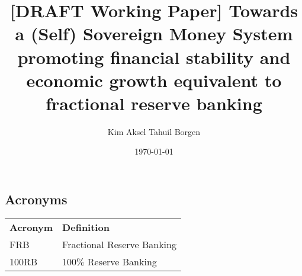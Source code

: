 \documentclass{article}
\title{[DRAFT Working Paper] Towards a (Self) Sovereign Money System promoting financial stability and economic growth equivalent to fractional reserve banking}
\author{Kim Aksel Tahuil Borgen}
\date{\today}
\begin{document}
\maketitle

\begin{abstract}
        
\end{abstract}
\subsection{Acronyms}

\begin{tabular}{ll}
\textbf{Acronym} & \textbf{Definition} \\
FRB & Fractional Reserve Banking \\
100RB & 100\% Reserve Banking \\
\end{tabular}





\printbibliography
\end{document}
